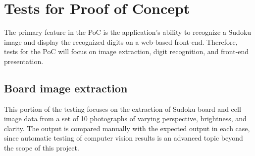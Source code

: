 \documentclass[11pt]{article}
\begin{document}
\section{Tests for Proof of Concept}

The primary feature in the PoC is the application's ability to recognize a Sudoku image and display the recognized digits on a web-based front-end. Therefore, tests for the PoC will focus on image extraction, digit recognition, and front-end presentation.

\subsection{Board image extraction}
		
This portion of the testing focuses on the extraction of Sudoku board and cell image data from a set of 10 photographs of varying perspective, brightness, and clarity. The output is compared manually with the expected output in each case, since automatic testing of computer vision results is an advanced topic beyond the scope of this project.
\end{document}
